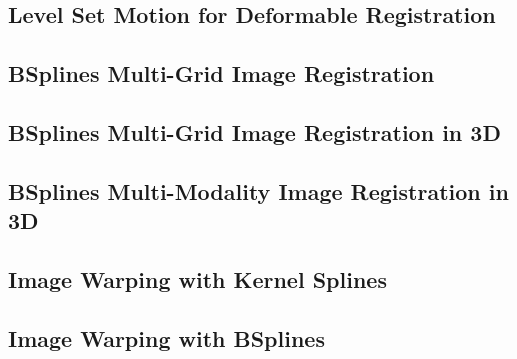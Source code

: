 \ifitkFullVersion

\fi




\subsection{Level Set Motion for Deformable Registration}
\label{sec:LevelSetMotionForDeformableRegistration}

\ifitkFullVersion

\fi




\subsection{BSplines Multi-Grid Image Registration}
\label{sec:BSplinesMultiGridImageRegistration}

\ifitkFullVersion

\fi



\subsection{BSplines Multi-Grid Image Registration in 3D}
\label{sec:BSplinesMultiGridImageRegistrationIn3D}

\ifitkFullVersion

\fi



\subsection{BSplines Multi-Modality Image Registration in 3D}
\label{sec:BSplinesImageRegistrationIn3D}

\ifitkFullVersion

\fi


\subsection{Image Warping with Kernel Splines}
\label{sec:ImageWarpingWithKernelSplines}

\ifitkFullVersion

\fi



\subsection{Image Warping with BSplines}
\label{sec:ImageWarpingWithBSplines}

\ifitkFullVersion

\fi

